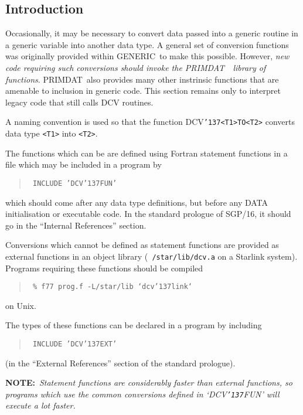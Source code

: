 \documentclass[twoside,11pt]{article}
\renewcommand{\_}{{\tt\char'137}}     %
\newcommand{\xref}[3]{#1}
\newcommand{\GENERIC}{{\footnotesize GENERIC}\normalsize}
\newcommand{\PRIMDAT}{{\footnotesize PRIMDAT}\normalsize}
\newcommand{\PRIMDATref}{\xref{\PRIMDAT}{sun39}{}~}
\begin{document}
\subsection{Introduction}

Occasionally, it may be necessary to convert data passed into a
generic routine in a generic variable into another data type. A
general set of conversion functions was originally provided within 
\GENERIC\ to make this possible.  However, \emph{new code requiring such
conversions should invoke the \PRIMDATref\ library of functions}.
\PRIMDAT\ also provides many other instrinsic functions that are
amenable to inclusion in generic code.  This section remains
only to interpret legacy code that still calls DCV routines.

A naming convention is used so that the function
DCV\_\verb+<T1>TO<T2>+ converts data type \verb+<T1>+ into \verb+<T2>+.

The functions which can be are defined using Fortran statement 
functions in a file which may be included in a program by

\begin{quote}{\tt
INCLUDE 'DCV\_FUN'
}
\end{quote}

which should come after any data type definitions, but before
any DATA initialisation or executable code.
In the standard prologue of SGP/16, it should go in the
``Internal References'' section.

Conversions which cannot be defined as statement functions are
provided as external functions in an object library ({\tt
/star/lib/dcv.a} on a Starlink system).  Programs requiring these
functions should be compiled

\begin{quote}{\tt
\% f77 prog.f -L/star/lib `dcv\_link`
}
\end{quote}

on Unix.

The types of these functions can be declared in a program by including

\begin{quote}{\tt
INCLUDE 'DCV\_EXT'
}
\end{quote}

(in the ``External References'' section of the standard prologue).

{\bf NOTE:}~{\it Statement functions are considerably faster than external 
functions, so programs which use the common conversions defined in `DCV\_FUN'
will execute a lot faster.}
\end{document}
